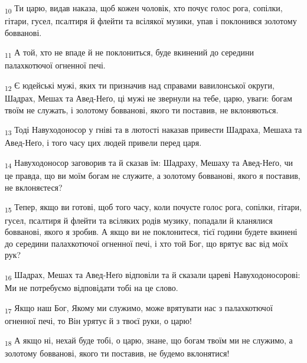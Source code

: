 \begin{tcolorbox}
\textsubscript{10} Ти царю, видав наказа, щоб кожен чоловік, хто почує голос рога, сопілки, гітари, гусел, псалтиря й флейти та всілякої музики, упав і поклонився золотому бовванові.
\end{tcolorbox}
\begin{tcolorbox}
\textsubscript{11} А той, хто не впаде й не поклониться, буде вкинений до середини палахкотючої огненної печі.
\end{tcolorbox}
\begin{tcolorbox}
\textsubscript{12} Є юдейські мужі, яких ти призначив над справами вавилонської округи, Шадрах, Мешах та Авед-Неґо, ці мужі не звернули на тебе, царю, уваги: богам твоїм не служать, і золотому бовванові, якого ти поставив, не вклоняються.
\end{tcolorbox}
\begin{tcolorbox}
\textsubscript{13} Тоді Навуходоносор у гніві та в лютості наказав привести Шадраха, Мешаха та Авед-Неґо, і того часу цих людей привели перед царя.
\end{tcolorbox}
\begin{tcolorbox}
\textsubscript{14} Навуходоносор заговорив та й сказав їм: Шадраху, Мешаху та Авед-Неґо, чи це правда, що ви моїм богам не служите, а золотому бовванові, якого я поставив, не вклоняєтеся?
\end{tcolorbox}
\begin{tcolorbox}
\textsubscript{15} Тепер, якщо ви готові, щоб того часу, коли почуєте голос рога, сопілки, гітари, гусел, псалтиря й флейти та всіляких родів музику, попадали й кланялися бовванові, якого я зробив. А якщо ви не поклонитеся, тієї години будете вкинені до середини палахкотючої огненної печі, і хто той Бог, що врятує вас від моїх рук?
\end{tcolorbox}
\begin{tcolorbox}
\textsubscript{16} Шадрах, Мешах та Авед-Неґо відповіли та й сказали цареві Навуходоносорові: Ми не потребуємо відповідати тобі на це слово.
\end{tcolorbox}
\begin{tcolorbox}
\textsubscript{17} Якщо наш Бог, Якому ми служимо, може врятувати нас з палахкотючої огненної печі, то Він урятує й з твоєї руки, о царю!
\end{tcolorbox}
\begin{tcolorbox}
\textsubscript{18} А якщо ні, нехай буде тобі, о царю, знане, що богам твоїм ми не служимо, а золотому бовванові, якого ти поставив, не будемо вклонятися!
\end{tcolorbox}
